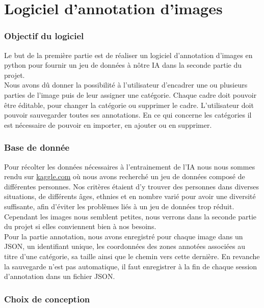 \part{Logiciel d'annotation d'images}
\section{Objectif du logiciel}

Le but de la première partie est de réaliser un logiciel d’annotation d’images en python pour fournir un jeu de données à nôtre IA dans la seconde partie du projet.\\

Nous avons dû donner la possibilité à l'utilisateur d'encadrer une ou plusieurs parties de l'image puis de leur assigner une catégorie. Chaque cadre doit pouvoir être éditable, pour changer la catégorie ou supprimer le cadre. L’utilisateur doit pouvoir sauvegarder toutes ses annotations. En ce qui concerne les catégories il est nécessaire de pouvoir en importer, en ajouter ou en supprimer.

\section{Base de donnée}
Pour récolter les données nécessaires à l'entrainement de l'IA nous nous sommes rendu sur \href{https://www.kaggle.com/swann00/masque-vs-sans-masque}{kaggle.com} où nous avons recherché un jeu de données composé de différentes personnes. Nos critères étaient d'y trouver des personnes dans diverses situations, de différents âges, ethnies et en nombre varié pour avoir une diversité suffisante, afin d'éviter les problèmes liés à un jeu de données trop réduit. Cependant les images nous semblent petites, nous verrons dans la seconde partie du projet si elles conviennent bien à nos besoins.\\

Pour la partie annotation, nous avons enregistré pour chaque image dans un JSON, un identifiant unique, les coordonnées des zones annotées associées au titre d'une catégorie, sa taille ainsi que le chemin vers cette dernière. En revanche la sauvegarde n'est pas automatique, il faut enregistrer à la fin de chaque session d'annotation dans un fichier JSON.

\newpage
\section{Choix de conception}

